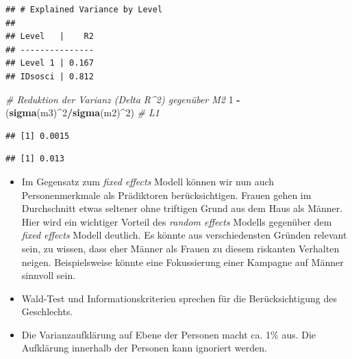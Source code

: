 \documentclass[
]{book}
\newenvironment{Shaded}{\begin{snugshade}}{\end{snugshade}}
\newcommand{\CommentTok}[1]{\textcolor[rgb]{0.56,0.35,0.01}{\textit{#1}}}
\newcommand{\DecValTok}[1]{\textcolor[rgb]{0.00,0.00,0.81}{#1}}
\newcommand{\KeywordTok}[1]{\textcolor[rgb]{0.13,0.29,0.53}{\textbf{#1}}}
\newcommand{\NormalTok}[1]{#1}
\newcommand{\OperatorTok}[1]{\textcolor[rgb]{0.81,0.36,0.00}{\textbf{#1}}}
\newcommand{\StringTok}[1]{\textcolor[rgb]{0.31,0.60,0.02}{#1}}
\providecommand{\tightlist}{%
  \setlength{\itemsep}{0pt}\setlength{\parskip}{0pt}}
\begin{document}
\begin{verbatim}
## # Explained Variance by Level
## 
## Level   |    R2
## ---------------
## Level 1 | 0.167
## IDsosci | 0.812
\end{verbatim}

\begin{Shaded}
\begin{Highlighting}[]
\CommentTok{# Reduktion der Varianz (Delta R^2) gegenüber M2}
\DecValTok{1} \OperatorTok{-}\StringTok{ }\NormalTok{(}\KeywordTok{sigma}\NormalTok{(m3)}\OperatorTok{^}\DecValTok{2}\OperatorTok{/}\KeywordTok{sigma}\NormalTok{(m2)}\OperatorTok{^}\DecValTok{2}\NormalTok{)  }\CommentTok{# L1}
\end{Highlighting}
\end{Shaded}

\begin{verbatim}
## [1] 0.0015
\end{verbatim}

\begin{Shaded}
\end{Shaded}

\begin{verbatim}
## [1] 0.013
\end{verbatim}

\begin{itemize}
\tightlist
\item
  Im Gegensatz zum \emph{fixed effects} Modell können wir nun auch Personenmerkmale als Prädiktoren berücksichtigen. Frauen gehen im Durchschnitt etwas seltener ohne triftigen Grund aus dem Haus als Männer. Hier wird ein wichtiger Vorteil des \emph{random effects} Modells gegenüber dem \emph{fixed effects} Modell deutlich. Es könnte aus verschiedensten Gründen relevant sein, zu wissen, dass eher Männer als Frauen zu diesem riskanten Verhalten neigen. Beispielsweise könnte eine Fokussierung einer Kampagne auf Männer sinnvoll sein.
\item
  Wald-Test und Informationskriterien sprechen für die Berücksichtigung des Geschlechts.
\item
  Die Varianzaufklärung auf Ebene der Personen macht ca. 1\% aus. Die Aufklärung innerhalb der Personen kann ignoriert werden.
\end{itemize}
\end{document}
